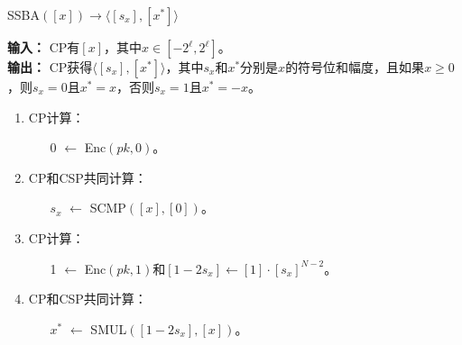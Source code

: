 \begin{algorithm}
\caption{SSBA\(([x])\rightarrow\langle[s_{x}],[x^{*}]\rangle\)}
\textbf{输入：} CP有\([x]\)，其中\(x\in[-2^{\ell},2^{\ell}]\)。\\
\textbf{输出：} CP获得\(\langle[s_{x}],[x^{*}]\rangle\)，其中\(s_{x}\)和\(x^{*}\)分别是\(x\)的符号位和幅度，且如果\(x\geq 0\)，则\(s_{x}=0\)且\(x^{*}=x\)，否则\(s_{x}=1\)且\(x^{*}=-x\)。
\begin{enumerate}
    \item CP计算：
    \begin{itemize}
        \item [0]\(\leftarrow\) Enc\((pk,0)\)。
    \end{itemize}
    \item CP和CSP共同计算：
    \begin{itemize}
        \item [\(s_{x}\)]\(\leftarrow\) SCMP\(([x],[0])\)。
    \end{itemize}
    \item CP计算：
    \begin{itemize}
        \item [1]\(\leftarrow\) Enc\((pk,1)\)和\([1-2s_{x}]\leftarrow[1]\cdot[s_{x}]^{N-2}\)。
    \end{itemize}
    \item CP和CSP共同计算：
    \begin{itemize}
        \item [\(x^{*}\)]\(\leftarrow\) SMUL\(([1-2s_{x}],[x])\)。
    \end{itemize}
\end{enumerate}
\end{algorithm}

